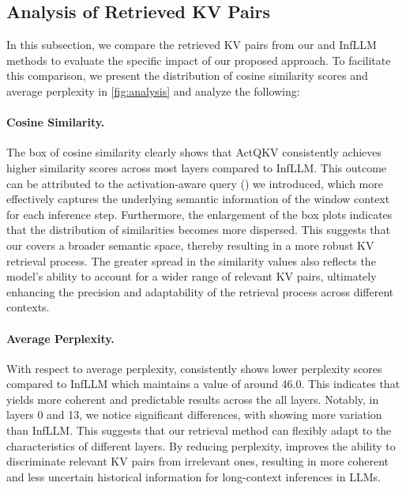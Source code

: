 \subsection{Analysis of Retrieved KV Pairs}
\label{sec:analysis}

In this subsection, we compare the retrieved KV pairs from our \name and InfLLM methods to evaluate the specific impact of our proposed approach. To facilitate this comparison, we present the distribution of cosine similarity scores and average perplexity in \cref{fig:analysis} and analyze the following:

\paragraph{Cosine Similarity.} The box of cosine similarity clearly shows that ActQKV consistently achieves higher similarity scores across most layers compared to InfLLM. This outcome can be attributed to the activation-aware query (\pq) we introduced, which more effectively captures the underlying semantic information of the window context for each inference step. Furthermore, the enlargement of the box plots indicates that the distribution of similarities becomes more dispersed. This suggests that our \pq covers a broader semantic space, thereby resulting in a more robust KV retrieval process. The greater spread in the similarity values also reflects the model’s ability to account for a wider range of relevant KV pairs, ultimately enhancing the precision and adaptability of the retrieval process across different contexts.

\paragraph{Average Perplexity.} With respect to average perplexity, \name consistently shows lower perplexity scores compared to InfLLM which maintains a value of around 46.0. This indicates that \name yields more coherent and predictable results across the all layers. Notably, in layers 0 and 13, we notice significant differences, with \name showing more variation than InfLLM. This suggests that our retrieval method can flexibly adapt to the characteristics of different layers. By reducing perplexity, \name improves the ability to discriminate relevant KV pairs from irrelevant ones, resulting in more coherent and less uncertain historical information for long-context inferences in LLMs.
